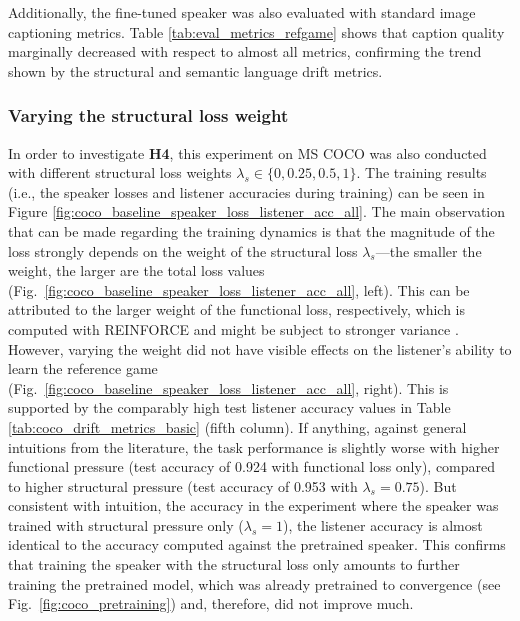 
Additionally, the fine-tuned speaker was also evaluated with standard image captioning metrics. Table \ref{tab:eval_metrics_refgame} shows that caption quality marginally decreased with respect to almost all metrics, confirming the trend shown by the structural and semantic language drift metrics.

\subsubsection{Varying the structural loss weight}
In order to investigate \textbf{H4}, this experiment on MS COCO was also conducted with different structural loss weights $\lambda_s \in \{0, 0.25, 0.5, 1\}$. The training results (i.e., the speaker losses and listener accuracies during training) can be seen in Figure \ref{fig:coco_baseline_speaker_loss_listener_acc_all}. The main observation that can be made regarding the training dynamics is that the magnitude of the loss strongly depends on the weight of the structural loss $\lambda_s$---the smaller the weight, the larger are the total loss values (Fig.~\ref{fig:coco_baseline_speaker_loss_listener_acc_all}, left). This can be attributed to the larger weight of the functional loss, respectively, which is computed with REINFORCE and might be subject to stronger variance \parencite[cf.][]{havrylov2017emergence}. However, varying the weight did not have visible effects on the listener's ability to learn the reference game (Fig.~\ref{fig:coco_baseline_speaker_loss_listener_acc_all}, right). 
This is supported by the comparably high test listener accuracy values in Table \ref{tab:coco_drift_metrics_basic} (fifth column). If anything, against general intuitions from the literature, the task performance is slightly worse with higher functional pressure (test accuracy of 0.924 with functional loss only), compared to higher structural pressure (test accuracy of 0.953 with $\lambda_s = 0.75$). But consistent with intuition, the accuracy in the experiment where the speaker was trained with structural pressure only ($\lambda_s = 1$), the listener accuracy is almost identical to the accuracy computed against the pretrained speaker. This confirms that training the speaker with the structural loss only amounts to further training the pretrained model, which was already pretrained to convergence (see Fig.~\ref{fig:coco_pretraining}) and, therefore, did not improve much.

